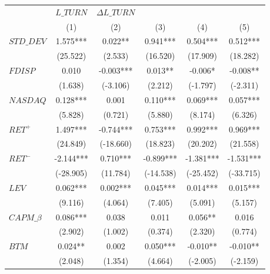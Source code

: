 \begin{spacing}{1.0}
\begin{table}
\begin{tabularx}{\linewidth}{X * {5}{S[table-format=4.3]}}
 &  &  &  &  &  \\
\cmidrule(l{3pt}r{3pt}){2-2} \cmidrule(l{3pt}r{3pt}){3-3} \cmidrule(l{3pt}r{3pt}){4-4} \cmidrule(l{3pt}r{3pt}){5-5} \cmidrule(l{3pt}r{3pt}){6-6}
 & {(1)} & {(2)} & {(3)} & {(4)} & {(5)}\\
\midrule
$STD\_DEV$ & 1.575*** & 0.022** & 0.941*** & 0.504*** & 0.512***\\
 & (25.522) & (2.533) & (16.520) & (17.909) & (18.282)\\
\addlinespace
$FDISP$ & 0.010 & -0.003*** & 0.013** & -0.006* & -0.008**\\
 & (1.638) & (-3.106) & (2.212) & (-1.797) & (-2.311)\\
\addlinespace
$NASDAQ$ & 0.128*** & 0.001 & 0.110*** & 0.069*** & 0.057***\\
 & (5.828) & (0.721) & (5.880) & (8.174) & (6.326)\\
\addlinespace
$RET^+$ & 1.497*** & -0.744*** & 0.753*** & 0.992*** & 0.969***\\
 & (24.849) & (-18.660) & (18.823) & (20.202) & (21.558)\\
\addlinespace
$RET^-$ & -2.144*** & 0.710*** & -0.899*** & -1.381*** & -1.531***\\
 & (-28.905) & (11.784) & (-14.538) & (-25.452) & (-33.715)\\
\addlinespace
$LEV$ & 0.062*** & 0.002*** & 0.045*** & 0.014*** & 0.015***\\
 & (9.116) & (4.064) & (7.405) & (5.091) & (5.157)\\
\addlinespace
$CAPM\_\beta$ & 0.086*** & 0.038 & 0.011 & 0.056** & 0.016\\
 & (2.902) & (1.002) & (0.374) & (2.320) & (0.774)\\
\addlinespace
$BTM$ & 0.024** & 0.002 & 0.050*** & -0.010** & -0.010**\\
 & (2.048) & (1.354) & (4.664) & (-2.005) & (-2.159)\\

\end{tabularx}
\end{table}
\end{spacing}
